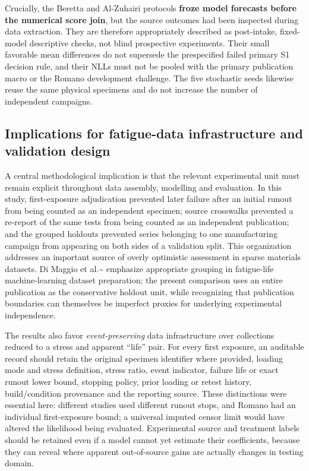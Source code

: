 \documentclass[12pt,a4paper]{article}
\begin{document}
Crucially, the Beretta and Al-Zuhairi protocols \textbf{froze model forecasts before the numerical score join}, but the source outcomes had been inspected during data extraction. They are therefore appropriately described as post-intake, fixed-model descriptive checks, not blind prospective experiments. Their small favorable mean differences do not supersede the prespecified failed primary S1 decision rule, and their NLLs must not be pooled with the primary publication macro or the Romano development challenge. The five stochastic seeds likewise reuse the same physical specimens and do not increase the number of independent campaigns.

\subsection{Implications for fatigue-data infrastructure and validation design}

A central methodological implication is that the relevant experimental unit must remain explicit throughout data assembly, modelling and evaluation. In this study, first-exposure adjudication prevented later failure after an initial runout from being counted as an independent specimen; source crosswalks prevented a re-report of the same tests from being counted as an independent publication; and the grouped holdouts prevented series belonging to one manufacturing campaign from appearing on both sides of a validation split. This organization addresses an important source of overly optimistic assessment in sparse materials datasets. Di Maggio et al.\textasciitilde{}\cite{dimaggio2025} emphasize appropriate grouping in fatigue-life machine-learning dataset preparation; the present comparison uses an entire publication as the conservative holdout unit, while recognizing that publication boundaries can themselves be imperfect proxies for underlying experimental independence.

The results also favor \emph{event-preserving} data infrastructure over collections reduced to a stress and apparent “life” pair. For every first exposure, an auditable record should retain the original specimen identifier where provided, loading mode and stress definition, stress ratio, event indicator, failure life or exact runout lower bound, stopping policy, prior loading or retest history, build/condition provenance and the reporting source. These distinctions were essential here: different studies used different runout stops, and Romano had an individual first-exposure bound; a universal imputed censor limit would have altered the likelihood being evaluated. Experimental source and treatment labels should be retained even if a model cannot yet estimate their coefficients, because they can reveal where apparent out-of-source gains are actually changes in testing domain.
\end{document}
